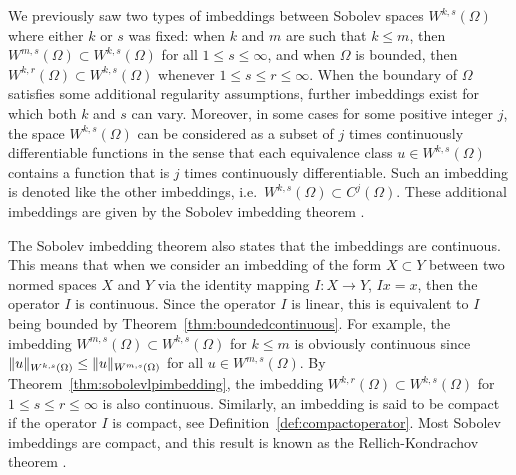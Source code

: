 \documentclass[english, 12pt, a4paper, sci, utf8, a-2b, online]{aaltothesis}
\theoremstyle{definition}
\theoremstyle{plain}
\DeclarePairedDelimiter\norm{\lVert}{\rVert}
\numberwithin{equation}{section}
\begin{document}
We previously saw two types of imbeddings between Sobolev spaces $W^{k,s}(\Omega)$
where either $k$ or $s$ was fixed:
when $k$ and $m$ are such that $k \leq m$, then
$W^{m,s}(\Omega) \subset W^{k,s}(\Omega)$ for all $1 \leq s \leq \infty$,
and when $\Omega$ is bounded, then $W^{k,r}(\Omega) \subset W^{k,s}(\Omega)$
whenever $1 \leq s \leq r \leq \infty$.
When the boundary of $\Omega$ satisfies some additional regularity
assumptions, further imbeddings exist for which both $k$ and $s$ can vary.
Moreover, in some cases for some positive integer $j$,
the space $W^{k,s}(\Omega)$ can be considered as a subset of
$j$ times continuously differentiable functions
in the sense that each 
equivalence class $u \in W^{k,s}(\Omega)$ contains a function
that is $j$ times continuously differentiable.
Such an imbedding is denoted like the other imbeddings, i.e.\
$W^{k,s}(\Omega) \subset C^j(\Omega)$. These additional imbeddings
are given by the Sobolev imbedding theorem \cite{adams2003}.

The Sobolev imbedding theorem also states that the imbeddings are continuous.
This means that when we consider an imbedding of the form $X \subset Y$
between two normed spaces $X$ and $Y$ via the identity mapping
$I: X \to Y$, $Ix = x$, then the operator $I$ is continuous.
Since the operator $I$ is linear, this is equivalent to $I$ being bounded
by Theorem~\ref{thm:boundedcontinuous}. For example, the imbedding
$W^{m,s}(\Omega) \subset W^{k,s}(\Omega)$ for $k \leq m$ is obviously
continuous since $\norm{u}_{W^{k,s}(\Omega)} \leq \norm{u}_{W^{m,s}(\Omega)}$
for all $u \in W^{m,s}(\Omega)$. By Theorem~\ref{thm:sobolevlpimbedding},
the imbedding $W^{k,r}(\Omega) \subset W^{k,s}(\Omega)$ for
$1 \leq s \leq r \leq \infty$ is also continuous.
Similarly, an imbedding is said to be compact if the operator $I$ is compact,
see Definition~\ref{def:compactoperator}. Most Sobolev imbeddings are
compact, and this result is known as the Rellich-Kondrachov theorem 
\cite{adams2003}.
\end{document}
